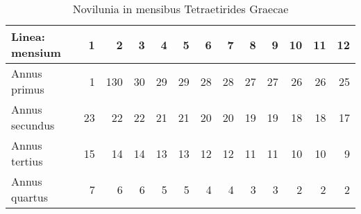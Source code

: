 %
%
\begin{table}[htbp]
\centering
\begin{tabular}{ l *{12}{r} }
Linea: mensium &
1 & 2 & 3 & 4 & 5 & 6 & 7 & 8 & 9 & 10 & 11 & 12
\\
\hline
Annus primus &
1 & 1\textbar{}30 & 30 & 29 & 29 & 28 & 28 & 27 & 27 & 26 & 26 & 25 
\\
Annus secundus &
23 & 22 & 22 &21  &21  & 20 & 20 & 19 & 19 & 18 & 18 & 17
\\
Annus tertius &
15 & 14 & 14 & 13 & 13 & 12 & 12 & 11 & 11 & 10 & 10 & 9
\\
Annus quartus &
7 & 6 & 6 & 5 & 5 & 4 & 4 & 3 & 3 & 2 & 2 & 2
\end{tabular}

\caption{Novilunia in mensibus Tetraetirides Graecae}
\label{tab:novilunia}
\end{table}
%
%
